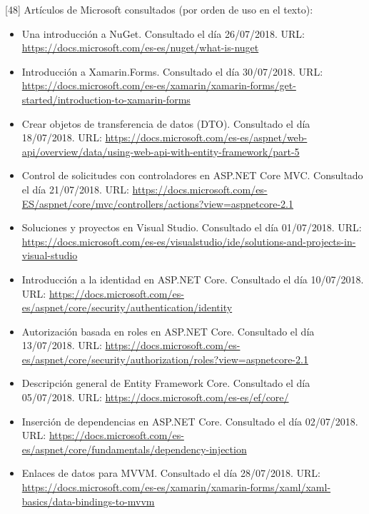 \documentclass[11pt,spanish,listoffigures]{tfgetsinf}
\begin{document}

{
[48]   Artículos de Microsoft consultados (por orden de uso en el texto):
\begin{itemize}

\item Una introducción a NuGet. Consultado el día 26/07/2018. URL: \url{https://docs.microsoft.com/es-es/nuget/what-is-nuget}

\item Introducción a Xamarin.Forms. Consultado el día 30/07/2018. URL: \url{https://docs.microsoft.com/es-es/xamarin/xamarin-forms/get-started/introduction-to-xamarin-forms}

\item Crear objetos de transferencia de datos (DTO). Consultado el día 18/07/2018. URL: \url{https://docs.microsoft.com/es-es/aspnet/web-api/overview/data/using-web-api-with-entity-framework/part-5}

\item Control de solicitudes con controladores en ASP.NET Core MVC. Consultado el día 21/07/2018. URL: \url{https://docs.microsoft.com/es-ES/aspnet/core/mvc/controllers/actions?view=aspnetcore-2.1}

\item Soluciones y proyectos en Visual Studio. Consultado el día 01/07/2018. URL: \url{https://docs.microsoft.com/es-es/visualstudio/ide/solutions-and-projects-in-visual-studio}

\item Introducción a la identidad en ASP.NET Core. Consultado el día 10/07/2018. URL: \url{https://docs.microsoft.com/es-es/aspnet/core/security/authentication/identity}

\item Autorización basada en roles en ASP.NET Core. Consultado el día 13/07/2018. URL: \url{https://docs.microsoft.com/es-es/aspnet/core/security/authorization/roles?view=aspnetcore-2.1}

\item Descripción general de Entity Framework Core. Consultado el día 05/07/2018. URL: \url{https://docs.microsoft.com/es-es/ef/core/}

\item Inserción de dependencias en ASP.NET Core. Consultado el día 02/07/2018. URL: \url{https://docs.microsoft.com/es-es/aspnet/core/fundamentals/dependency-injection}

\item Enlaces de datos para MVVM. Consultado el día 28/07/2018. URL: \url{https://docs.microsoft.com/es-es/xamarin/xamarin-forms/xaml/xaml-basics/data-bindings-to-mvvm}


\end{itemize}}
\end{document}

